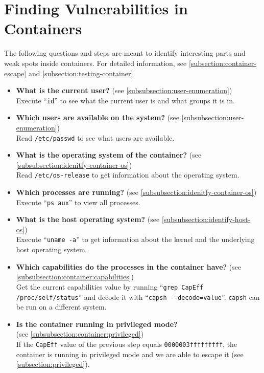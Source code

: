 \section{Finding Vulnerabilities in Containers}\label{section:checklist-vulnerabilities-container}
The following questions and steps are meant to identify interesting parts and weak spots inside containers. For detailed information, see \autoref{subsection:container-escape} and \autoref{subsection:testing-container}.

\begin{itemize}
    \item \textbf{What is the current user?} (see \autoref{subsubsection:user-enumeration})\\
    Execute ``\lstinline{id}'' to see what the current user is and what groups it is in.

    \item \textbf{Which users are available on the system?} (see \autoref{subsubsection:user-enumeration})\\
    Read \lstinline{/etc/passwd} to see what users are available.

    \item \textbf{What is the operating system of the container?} (see \autoref{subsubsection:idenitfy-container-os})\\
    Read \lstinline{/etc/os-release} to get information about the operating system.

    \item \textbf{Which processes are running?} (see \autoref{subsubsection:idenitfy-container-os})\\
    Execute ``\lstinline{ps aux}'' to view all processes.

    \item \textbf{What is the host operating system?} (see \autoref{subsubsection:identify-host-os})\\
    Execute ``\lstinline{uname -a}'' to get information about the kernel and the underlying host operating system.

    \item \textbf{Which capabilities do the processes in the container have?} (see \autoref{subsubsection:container:capabilities})\\
    Get the current capabilities value by running ``\lstinline{grep CapEff /proc/self/status}'' and decode it with ``\lstinline{capsh --decode=value}''. \lstinline{capsh} can be run on a different system.

    \item \textbf{Is the container running in privileged mode?}
    \\(see \autoref{subsubsection:container:privileged})\\
    If the \lstinline{CapEff} value of the previous step equals \lstinline{0000003fffffffff}, the container is running in privileged mode and we are able to escape it (see \autoref{subsection:privileged}).


\end{itemize}
